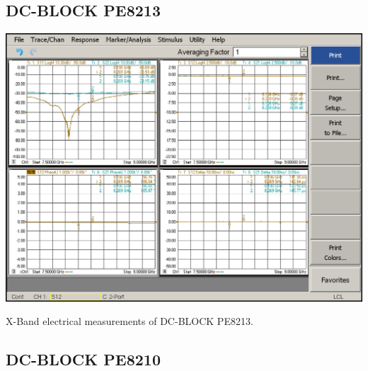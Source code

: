 
\subsection{DC-BLOCK PE8213}


\begin{table}[H]
	\centering
	\includegraphics[width=0.8\linewidth]{figuras/measures/DC-BLOCK-N-XB}
	\caption{X-Band electrical measurements of DC-BLOCK PE8213.}
	\label{fig:DC-BLOCK-N-XB}
\end{table}

\subsection{DC-BLOCK PE8210}


